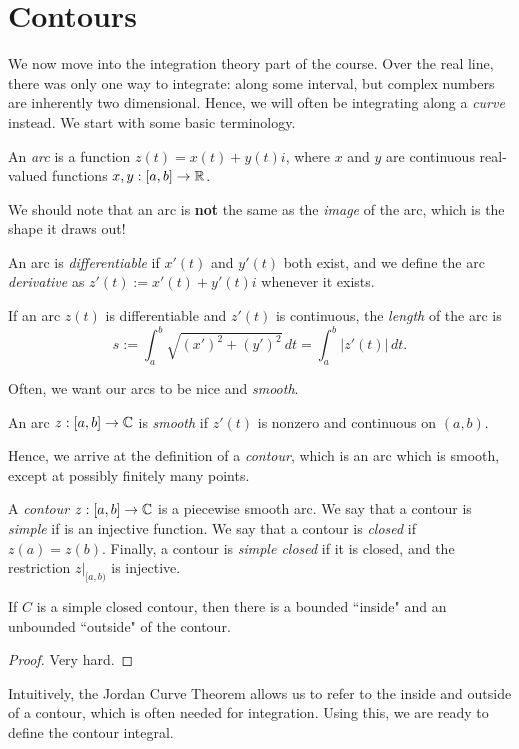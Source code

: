 \documentclass{article}
\begin{document}
\section{Contours}
We now move into the integration theory part of the course. Over the real line, there was only one way to integrate: along some interval, but complex numbers are inherently two dimensional. Hence, we will often be integrating along a \textit{curve} instead. We start with some basic terminology.
\begin{definition}
An \textit{arc} is a function $z(t) = x(t) + y(t)i$, where $x$ and $y$ are continuous real-valued functions $x, y: [a, b]\to \mathbb R$.
\end{definition}
We should note that an arc is \textbf{not} the same as the \textit{image} of the arc, which is the shape it draws out!
\begin{definition}
An arc is \textit{differentiable} if $x'(t)$ and $y'(t)$ both exist, and we define the arc \textit{derivative} as $z'(t) := x'(t) + y'(t)i$ whenever it exists.
\end{definition}
\begin{definition}
If an arc $z(t)$ is differentiable and $z'(t)$ is continuous, the \textit{length} of the arc is
$$s := \int_a^b \sqrt{(x')^2 + (y')^2} \, dt = \int_a^b |z'(t)| \, dt.$$
\end{definition}
Often, we want our arcs to be nice and \textit{smooth}.
\begin{definition}
An arc $z: [a,b]\to \mathbb C$ is \textit{smooth} if $z'(t)$ is nonzero and continuous on $(a, b)$.
\end{definition}
Hence, we arrive at the definition of a \textit{contour}, which is an arc which is smooth, except at possibly finitely many points.
\begin{definition}
A \textit{contour} $z: [a, b]\to \mathbb C$ is a piecewise smooth arc. We say that a contour is \textit{simple} if is an injective function. We say that a contour is \textit{closed} if $z(a) = z(b)$. Finally, a contour is \textit{simple closed} if it is closed, and the restriction $z|_{[a, b)}$ is injective.
\end{definition}
\begin{theorem}
If $C$ is a simple closed contour, then there is a bounded ``inside" and an unbounded ``outside" of the contour.
\end{theorem}
\begin{proof}
Very hard.
\end{proof}
\newpage
Intuitively, the Jordan Curve Theorem allows us to refer to the inside and outside of a contour, which is often needed for integration. Using this, we are ready to define the contour integral.
\end{document}
